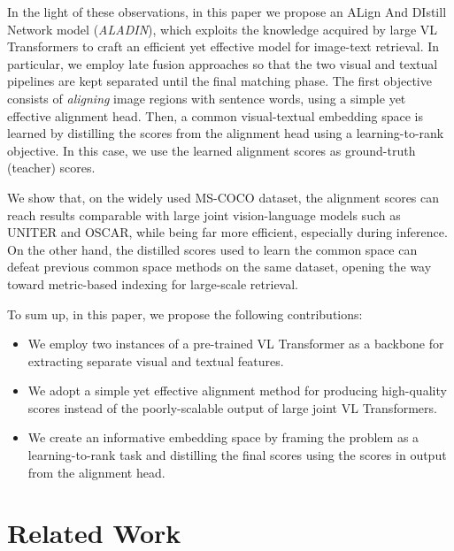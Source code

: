 \documentclass[sigconf]{acmart}
\newcommand{\ourmodel}{ALADIN}    \settopmatter{authorsperrow=4}
\begin{document}
In the light of these observations, in this paper we propose an ALign And DIstill Network model (\textit{\ourmodel}), which exploits the knowledge acquired by large VL Transformers to craft an efficient yet effective model for image-text retrieval. In particular, we employ late fusion approaches so that the two visual and textual pipelines are kept separated until the final matching phase. The first objective consists of \textit{aligning} image regions with sentence words, using a simple yet effective alignment head. Then, a common visual-textual embedding space is learned by distilling the scores from the alignment head using a learning-to-rank objective. In this case, we use the learned alignment scores as ground-truth (teacher) scores. 

We show that, on the widely used MS-COCO dataset, the alignment scores can reach results comparable with large joint vision-language models such as UNITER and OSCAR, while being far more efficient, especially during inference. On the other hand, the distilled scores used to learn the common space can defeat previous common space methods on the same dataset, opening the way toward metric-based indexing for large-scale retrieval.

To sum up, in this paper, we propose the following contributions:
\begin{itemize}
    \item We employ two instances of a pre-trained VL Transformer as a backbone for extracting separate visual and textual features. \item We adopt a simple yet effective alignment method for producing high-quality scores instead of the poorly-scalable output of large joint VL Transformers.
    \item We create an informative embedding space by framing the problem as a learning-to-rank task and distilling the final scores using the scores in output from the alignment head.
\end{itemize} \section{Related Work}
\label{sec:related}
\end{document}
